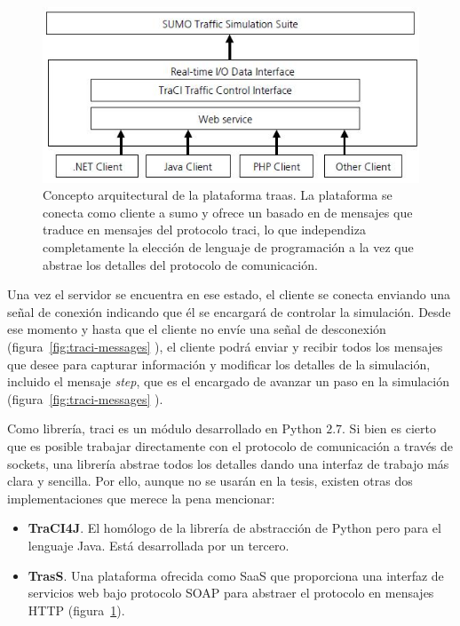 \begin{figure}
	\centering
	\includegraphics{images/traas}
	\caption{Concepto arquitectural de la plataforma \gls{traas}. La plataforma se conecta como cliente a \gls{sumo} y ofrece un  basado en  de mensajes que traduce en mensajes del protocolo \gls{traci}, lo que independiza completamente la elección de lenguaje de programación a la vez que abstrae los detalles del protocolo de comunicación.}
	\label{fig:traas}
\end{figure}

Una vez el servidor se encuentra en ese estado, el cliente se conecta enviando una señal de conexión indicando que él se encargará de controlar la simulación. Desde ese momento y hasta que el cliente no envíe una señal de desconexión (figura~\ref{fig:traci-messages} ), el cliente podrá enviar y recibir todos los mensajes que desee para capturar información y modificar los detalles de la simulación, incluido el mensaje \textit{step}, que es el encargado de avanzar un paso en la simulación (figura~\ref{fig:traci-messages} ).

Como librería, \gls{traci} es un módulo desarrollado en \mbox{Python} $2$.$7$. Si bien es cierto que es posible trabajar directamente con el protocolo de comunicación a través de sockets, una librería abstrae todos los detalles dando una interfaz de trabajo más clara y sencilla. Por ello, aunque no se usarán en la tesis, existen otras dos implementaciones que merece la pena mencionar:

\begin{itemize}
	\item \textbf{TraCI4J}. El homólogo de la librería de abstracción de Python pero para el lenguaje Java. Está desarrollada por un tercero.
	\item \textbf{TrasS}. Una plataforma ofrecida como SaaS que proporciona una interfaz de servicios web bajo protocolo SOAP para abstraer el protocolo en mensajes HTTP (figura~\ref{fig:traas}).
\end{itemize}

